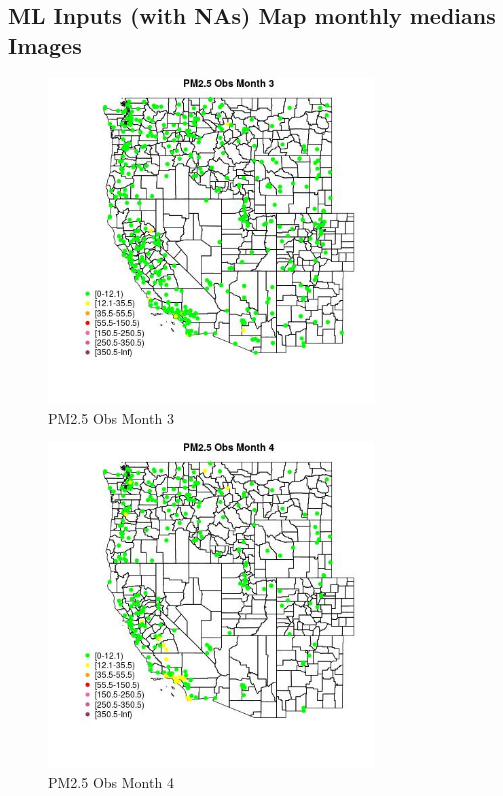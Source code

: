 
\subsection{ML Inputs (with NAs) Map monthly medians Images} 
 

\begin{figure} 
\centering  
\includegraphics[width=0.77\textwidth]{Code_Outputs/Report_ML_input_PM25_Step4_part_e_de_duplicated_aveswNAs_MapObsMo3PM25_Obs.jpg} 
\caption{\label{fig:Report_ML_input_PM25_Step4_part_e_de_duplicated_aveswNAsMapObsMo3PM25_Obs}PM2.5 Obs Month 3} 
\end{figure} 
 

\begin{figure} 
\centering  
\includegraphics[width=0.77\textwidth]{Code_Outputs/Report_ML_input_PM25_Step4_part_e_de_duplicated_aveswNAs_MapObsMo4PM25_Obs.jpg} 
\caption{\label{fig:Report_ML_input_PM25_Step4_part_e_de_duplicated_aveswNAsMapObsMo4PM25_Obs}PM2.5 Obs Month 4} 
\end{figure} 
 

